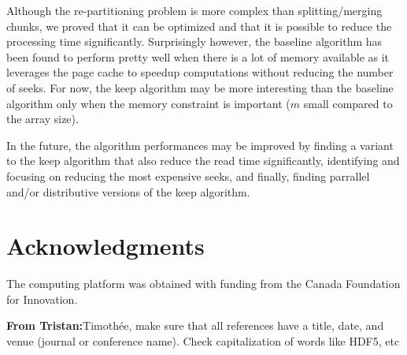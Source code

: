\documentclass[sigconf, nonacm]{acmart}
\newcommand{\tristan}[1]{\color{orange}\textbf{From Tristan:}#1\color{black}}
\begin{document}
Although the re-partitioning problem is more complex than splitting/merging chunks,
we proved that it can be optimized and that it is possible to reduce the
processing time significantly.
Surprisingly however, the baseline algorithm has been found to perform pretty
well when there is a lot of memory available as it leverages the page cache to
speedup computations without reducing the number of seeks.
For now, the keep algorithm may be more interesting than the baseline algorithm
only when the memory constraint is important ($m$ small compared to the array size).

In the future, the algorithm performances may be improved by finding a variant
to the keep algorithm that also reduce the read time significantly,
identifying and focusing on reducing the most expensive seeks,
and finally, finding parrallel and/or distributive versions of the keep algorithm.

\section{Acknowledgments}

The computing platform was obtained with funding from the Canada Foundation for Innovation.

\tristan{Timothée, make sure that all references have a title, date, and venue (journal or conference name). 
Check capitalization of words like HDF5, etc}



\end{document}
